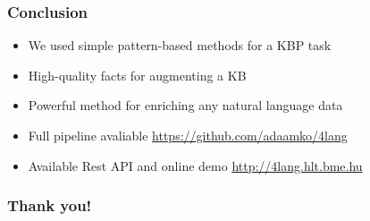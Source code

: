 \documentclass[bigger]{beamer}
\begin{document}

\begin{frame}
\frametitle{Conclusion}
\begin{itemize}
    \pause \item We used simple pattern-based methods for a KBP task
    \pause \item High-quality facts for augmenting a KB
    \pause \item Powerful method for enriching any natural language data
    \pause \item Full pipeline avaliable \url{https://github.com/adaamko/4lang}
    \pause \item Available Rest API and online demo \url{http://4lang.hlt.bme.hu}
\end{itemize}

\end{frame}
\begin{frame}
    \frametitle{Thank you!}
    \AtNextBibliography{\tiny}
    \printbibliography
\end{frame}
\end{document}
